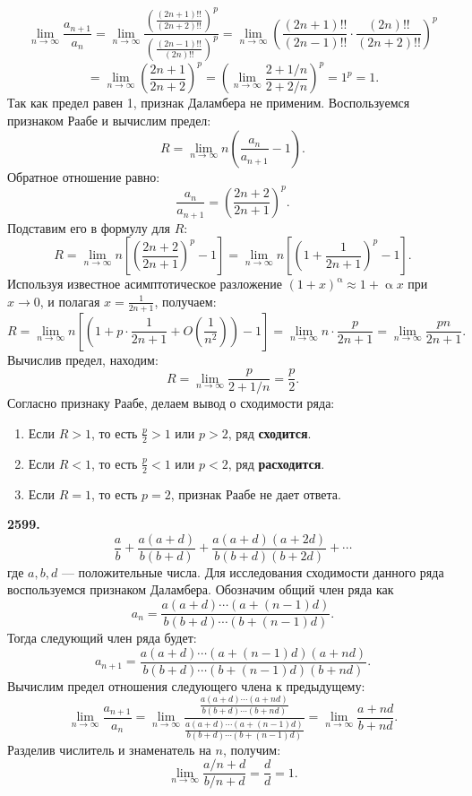 \documentclass[a4paper, 12pt]{report}
\numberwithin{equation}{section}
\renewcommand{\alpha}{\upalpha}
\begin{document}
	$$ \lim_{n \to \infty} \frac{a_{n+1}}{a_n} = \lim_{n \to \infty} \frac{\left(\frac{(2n+1)!!}{(2n+2)!!}\right)^p}{\left(\frac{(2n-1)!!}{(2n)!!}\right)^p} = \lim_{n \to \infty} \left(\frac{(2n+1)!!}{(2n-1)!!} \cdot \frac{(2n)!!}{(2n+2)!!}\right)^p $$
	$$ = \lim_{n \to \infty} \left(\frac{2n+1}{2n+2}\right)^p = \left(\lim_{n \to \infty} \frac{2+1/n}{2+2/n}\right)^p = 1^p = 1. $$
	Так как предел равен 1, признак Даламбера не применим. Воспользуемся признаком Раабе и вычислим предел:
	$$ R = \lim_{n \to \infty} n \left( \frac{a_n}{a_{n+1}} - 1 \right). $$
	Обратное отношение равно:
	$$ \frac{a_n}{a_{n+1}} = \left(\frac{2n+2}{2n+1}\right)^p. $$
	Подставим его в формулу для $R$:
	$$ R = \lim_{n \to \infty} n \left[ \left(\frac{2n+2}{2n+1}\right)^p - 1 \right] = \lim_{n \to \infty} n \left[ \left(1 + \frac{1}{2n+1}\right)^p - 1 \right]. $$
	Используя известное асимптотическое разложение $(1+x)^\alpha \approx 1 + \alpha x$ при $x \to 0$, и полагая $x = \frac{1}{2n+1}$, получаем:
	$$ R = \lim_{n \to \infty} n \left[ \left(1 + p \cdot \frac{1}{2n+1} + O\left(\frac{1}{n^2}\right)\right) - 1 \right] = \lim_{n \to \infty} n \cdot \frac{p}{2n+1} = \lim_{n \to \infty} \frac{pn}{2n+1}. $$
	Вычислив предел, находим:
	$$ R = \lim_{n \to \infty} \frac{p}{2+1/n} = \frac{p}{2}. $$
	Согласно признаку Раабе, делаем вывод о сходимости ряда:
	\begin{enumerate}
		\item Если $R > 1$, то есть $\frac{p}{2} > 1$ или $p > 2$, ряд \textbf{сходится}.
		\item Если $R < 1$, то есть $\frac{p}{2} < 1$ или $p < 2$, ряд \textbf{расходится}.
		\item Если $R = 1$, то есть $p = 2$, признак Раабе не дает ответа.
	\end{enumerate}
	\textbf{2599.}
	$$ \frac{a}{b} + \frac{a(a+d)}{b(b+d)} + \frac{a(a+d)(a+2d)}{b(b+d)(b+2d)} + \cdots $$
	где $a, b, d$ — положительные числа.
	Для исследования сходимости данного ряда воспользуемся признаком Даламбера. Обозначим общий член ряда как
	$$ a_n = \frac{a(a+d)\cdots(a+(n-1)d)}{b(b+d)\cdots(b+(n-1)d)}. $$
	Тогда следующий член ряда будет:
	$$ a_{n+1} = \frac{a(a+d)\cdots(a+(n-1)d)(a+nd)}{b(b+d)\cdots(b+(n-1)d)(b+nd)}. $$
	Вычислим предел отношения следующего члена к предыдущему:
	$$ \lim_{n \to \infty} \frac{a_{n+1}}{a_n} = \lim_{n \to \infty} \frac{\frac{a(a+d)\cdots(a+nd)}{b(b+d)\cdots(b+nd)}}{\frac{a(a+d)\cdots(a+(n-1)d)}{b(b+d)\cdots(b+(n-1)d)}} = \lim_{n \to \infty} \frac{a+nd}{b+nd}. $$
	Разделив числитель и знаменатель на $n$, получим:
	$$ \lim_{n \to \infty} \frac{a/n+d}{b/n+d} = \frac{d}{d} = 1. $$
\end{document}
